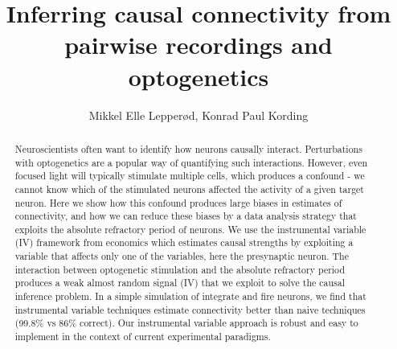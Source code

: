 \documentclass[11pt]{article}
\title{Inferring causal connectivity from pairwise recordings and optogenetics}
\author{Mikkel Elle Lepper\o{}d, Konrad Paul Kording}
\begin{document}
 \maketitle

\begin{abstract}
\noindent Neuroscientists often want to identify how neurons causally interact. Perturbations with optogenetics are a popular way of quantifying such interactions. However, even focused light will typically stimulate multiple cells, which produces a confound - we cannot know which of the stimulated neurons affected the activity of a given target neuron. Here we show how this confound produces large biases in estimates of connectivity, and how we can reduce these biases by a data analysis strategy that exploits the absolute refractory period of neurons. We use the instrumental variable (IV) framework from economics which estimates causal strengths by exploiting a variable that affects only one of the variables, here the presynaptic neuron. The interaction between optogenetic stimulation and the absolute refractory period produces a weak almost random signal (IV) that we exploit to solve the causal inference problem. In a simple simulation of integrate and fire neurons, we find that instrumental variable techniques estimate connectivity better than naive techniques (99.8\% vs 86\% correct). Our instrumental variable approach is robust and easy to implement in the context of current experimental paradigms.
\end{abstract} 
\end{document}
